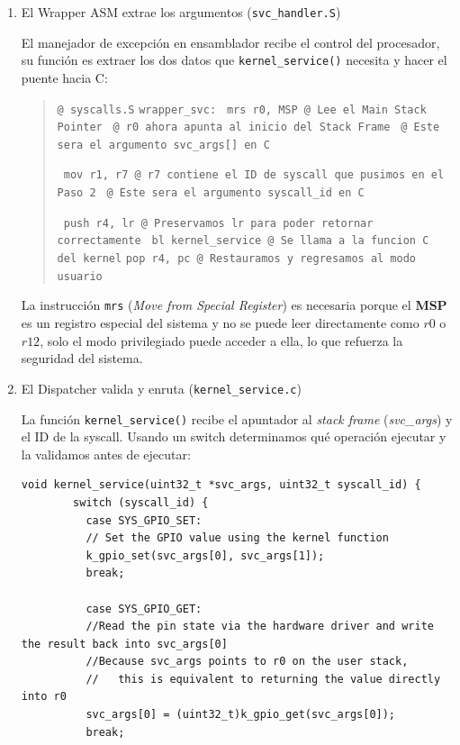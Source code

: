\documentclass[12pt,letterpaper]{article}
\begin{document}
\begin{enumerate}[label=Paso \arabic*.]
\item El Wrapper ASM extrae los argumentos (\texttt{svc\_handler.S})

  El manejador de excepción en ensamblador recibe el control del procesador, su función es extraer los dos datos que \texttt{kernel\_service()} necesita y hacer el puente hacia C:

  \begin{quote}
    \texttt{@ syscalls.S}
    \texttt{wrapper\_svc:}
    \texttt{    mrs r0, MSP          @ Lee el Main Stack Pointer}
    \texttt{                         @ r0 ahora apunta al inicio del Stack Frame}
    \texttt{                         @ Este sera el argumento svc\_args[] en C}
    
    \texttt{    mov r1, r7           @ r7 contiene el ID de syscall que pusimos en el Paso 2}
    \texttt{                         @ Este sera el argumento syscall\_id en C}
    
    \texttt{    push {r4, lr}        @ Preservamos lr para poder retornar correctamente}
    \texttt{    bl kernel\_service   @ Se llama a la funcion C del kernel}
    \texttt     {pop {r4, pc}        @ Restauramos y regresamos al modo usuario}
  \end{quote}
  
  La instrucción \texttt{mrs} (\textit{Move from Special Register}) es necesaria porque el \textbf{MSP} es un registro especial del sistema y no se puede leer directamente como $r0$ o $r12$, solo el modo privilegiado puede acceder a ella, lo que refuerza la seguridad del sistema.
  
\item El Dispatcher valida y enruta (\texttt{kernel\_service.c})
  
  La función \texttt{kernel\_service()} recibe el apuntador al \textit{stack frame} (\textit{svc\_args}) y el ID de la syscall. Usando un switch determinamos qué operación ejecutar y la validamos antes de ejecutar:
  
  \begin{lstlisting}[style=modernc]
      void kernel_service(uint32_t *svc_args, uint32_t syscall_id) {
        switch (syscall_id) {
          case SYS_GPIO_SET:
          // Set the GPIO value using the kernel function
          k_gpio_set(svc_args[0], svc_args[1]);
          break;
          
          case SYS_GPIO_GET:
          //Read the pin state via the hardware driver and write the result back into svc_args[0]
          //Because svc_args points to r0 on the user stack,
          //   this is equivalent to returning the value directly into r0
          svc_args[0] = (uint32_t)k_gpio_get(svc_args[0]);
          break;
          

\end{lstlisting}
\end{enumerate}
\end{document}
